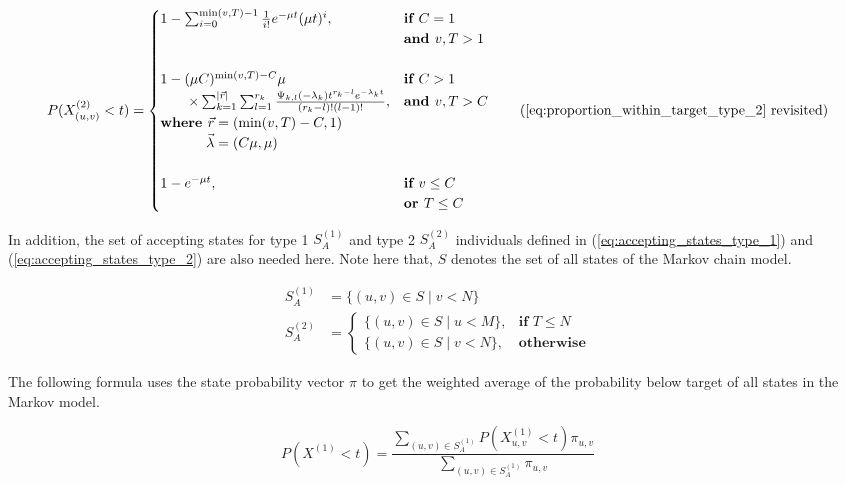 \begin{equation}
    P(X_{(u,v)}^{(2)} < t) = 
    \begin{cases}
        1 - \sum_{i=0}^{\min(v,T)-1} \frac{1}{i!} e^{-\mu t} (\mu t)^i,  
            & \textbf{if } C = 1 \\ 
            & \textbf{and } v, T > 1 \\
            & \\
        1 - (\mu C) ^ {\min(v,T) - C} \mu  & \textbf{if } C > 1 \\
        \qquad \times \sum_{k=1}^{\mid \vec{r} \mid} \sum_{l=1}^{r_k} 
            \frac{\Psi_{k,l}(-\lambda_k)t^{r_k - l} 
            e^{-\lambda_k t}}{(r_k - l)! (l - 1)!}, 
            & \textbf{and } v, T  > C \\
        \textbf{where } \vec{r}=(\min(v, T) - C, 1) \\
        \hspace{1.15cm} \vec{\lambda}=(C \mu, \mu) \\
        & \\
        1 - e^{-\mu t}, & \textbf{if } v \leq C \\ 
        & \textbf{or } T \leq C \\
    \end{cases}
    \tag{\ref{eq:proportion_within_target_type_2} revisited}
\end{equation}


In addition, the set of accepting states for type 1 \(S_A^{(1)}\) and type 2 
\(S_A^{(2)}\) individuals defined in (\ref{eq:accepting_states_type_1}) and 
(\ref{eq:accepting_states_type_2}) are also needed here.
Note here that, \(S\) denotes the set of all states of the Markov chain model. 

\begin{align*}
    S_A^{(1)} &= \{(u, v) \in S \; | \; v < N \} \\
    S_A^{(2)} &=
    \begin{cases}
        \{(u, v) \in S \; | \; u < M \}, & \textbf{if } T \leq N \\
        \{(u, v) \in S \; | \; v < N \}, & \textbf{otherwise}
    \end{cases}
\end{align*}

The following formula uses the state probability vector \(\pi\) to get the 
weighted average of the probability below target of all states in the Markov
model.

\begin{equation}
    P(X^{(1)} < t) = \frac{\sum_{(u,v) \in S_A^{(1)}} P(X_{u,v}^{(1)} < t) 
    \pi_{u,v} }{\sum_{(u,v) \in S_A^{(1)}} \pi_{u,v}}
\end{equation}

